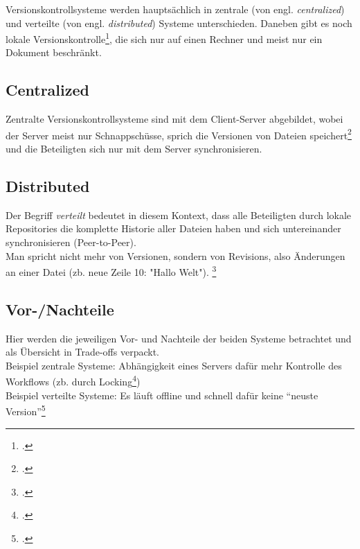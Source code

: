 Versionskontrollsysteme werden hauptsächlich in zentrale (von engl. \textit{centralized}) und verteilte (von engl. \textit{distributed}) Systeme unterschieden. Daneben gibt es noch 
lokale Versionskontrolle\footcite[Siehe][S. 1]{pro_git}, die sich nur auf einen Rechner und meist nur ein Dokument beschränkt.

\subsection{Centralized}
	Zentralte Versionskontrollsysteme sind mit dem Client-Server abgebildet, wobei der Server meist nur Schnappschüsse, sprich die 
	Versionen von Dateien speichert\footcite[Vgl.][S. 671]{art:transition} und die Beteiligten sich nur mit dem Server synchronisieren.

\subsection{Distributed}
	Der Begriff \textit{verteilt} bedeutet in diesem Kontext, dass alle Beteiligten durch lokale Repositories die komplette Historie aller Dateien haben und sich untereinander synchronisieren (Peer-to-Peer).\\
	Man spricht nicht mehr von Versionen, sondern von Revisions, also Änderungen an einer Datei (zb. neue Zeile 10: "Hallo Welt").
	\footcite[Siehe][für anschauliche Beispiele]{online:intro}

\subsection{Vor-/Nachteile}
	Hier werden die jeweiligen Vor- und Nachteile der beiden Systeme betrachtet und als Übersicht in Trade-offs verpackt.\\
	Beispiel zentrale Systeme: Abhängigkeit eines Servers dafür mehr Kontrolle des Workflows (zb. durch Locking\footcite[Erklärung des Mechanisumses][S. 3-4]{book:svn})\\
	Beispiel verteilte Systeme: Es läuft offline und schnell dafür keine "`neuste Version"'\footcite[Vgl.][]{online:intro}

